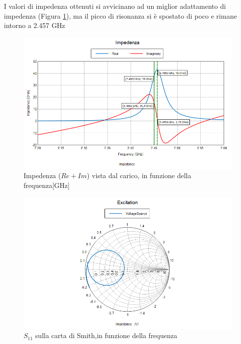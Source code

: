 \documentclass[twoside,twocolumn]{article}
\begin{document}
I valori di impedenza ottenuti si avvicinano ad un miglior adattamento di impedenza (Figura \ref{fig:A1_impedenza}), ma il picco di risonanza si è spostato di poco  e rimane intorno a 2.457 GHz
 \begin{figure}[h!]
  \includegraphics[width=\linewidth]{A1_impedenza.png}
  \caption{Impedenza ($Re +Im$) vista dal carico, in funzione della frequenza[GHz]}
  \label{fig:A1_impedenza}
\end{figure}
\begin{figure}[h!]
  \includegraphics[width=\linewidth]{A1_Smith.png}
  \caption{$S_{11} $ sulla carta di Smith,in funzione della frequenza }
  \label{fig:A1_Smith}
\end{figure}






\begin{thebibliography}{99} %



\end{thebibliography}

\end{document}
